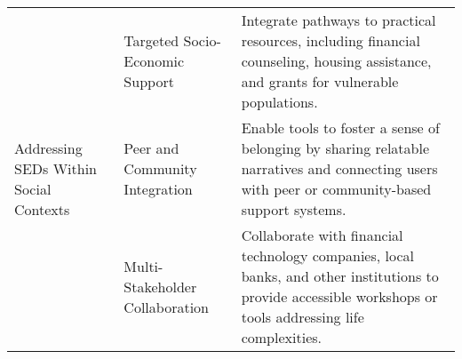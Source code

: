 \begin{table}[ht]
\begin{renv}
\begin{tabular}{|p{3cm}|p{3cm}|p{7cm}|}
\multirow[t]{4}{3cm}{Addressing SEDs Within Social Contexts} 
& \raggedright Targeted Socio-Economic Support & Integrate pathways to practical resources, including financial counseling, housing assistance, and grants for vulnerable populations. \\ \cline{2-3}
& \raggedright Peer and Community Integration & Enable tools to foster a sense of belonging by sharing relatable narratives and connecting users with peer or community-based support systems. \\ \cline{2-3}
& \raggedright Multi-Stakeholder Collaboration & Collaborate with financial technology companies, local banks, and other institutions to provide accessible workshops or tools addressing life complexities. \\ \hline
\end{tabular}
\end{renv}

\end{table}

